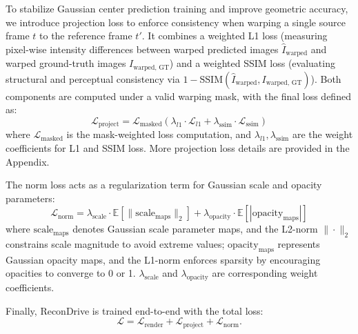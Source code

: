 To stabilize Gaussian center prediction training and improve geometric accuracy, we introduce projection loss to enforce consistency when warping a single source frame $t$ to the reference frame $t'$. It combines a weighted L1 loss (measuring pixel-wise intensity differences between warped predicted images $\hat{I}_{\text{warped}}$ and warped ground-truth images $I_{\text{warped, GT}}$) and a weighted SSIM loss (evaluating structural and perceptual consistency via $1 - \text{SSIM}(\hat{I}_{\text{warped}}, I_{\text{warped, GT}})$). Both components are computed under a valid warping mask, with the final loss defined as:
\begin{equation}
\mathcal{L}_{\text{project}} = \mathcal{L}_{\text{masked}} \left( \lambda_{l1} \cdot \mathcal{L}_{l1} + \lambda_{\text{ssim}} \cdot \mathcal{L}_{\text{ssim}} \right)
\end{equation}
where $\mathcal{L}_{\text{masked}}$ is the mask-weighted loss computation, and $\lambda_{l1}, \lambda_{\text{ssim}}$ are the weight coefficients for L1 and SSIM loss.
More projection loss details are provided in the Appendix.

The norm loss acts as a regularization term for Gaussian scale and opacity parameters:
\begin{equation}
\mathcal{L}_{\text{norm}} = \lambda_{\text{scale}} \cdot \mathbb{E}\left[ \|\text{scale}_\text{maps}\|_2 \right] + \lambda_{\text{opacity}} \cdot \mathbb{E}\left[ |\text{opacity}_\text{maps}| \right]
\end{equation}
where $\text{scale}_\text{maps}$ denotes Gaussian scale parameter maps, and the L2-norm $\|\cdot\|_2$ constrains scale magnitude to avoid extreme values; $\text{opacity}_\text{maps}$ represents Gaussian opacity maps, and the L1-norm enforces sparsity by encouraging opacities to converge to 0 or 1. $\lambda_{\text{scale}}$ and $\lambda_{\text{opacity}}$ are corresponding weight coefficients.

Finally, ReconDrive is trained end-to-end with the total loss:
\begin{equation}
\mathcal{L} = \mathcal{L}_{\text{render}} +  \mathcal{L}_{\text{project}} + \mathcal{L}_{\text{norm}}.
\end{equation}~\label{eq:training loss}
